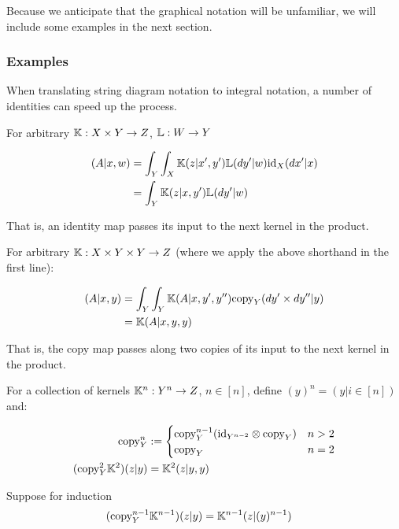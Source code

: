 Because we anticipate that the graphical notation will be unfamiliar, we will include some examples in the next section.

\subsubsection{Examples}

When translating string diagram notation to integral notation, a number of identities can speed up the process.

For arbitrary $\mathbb{K}:X\times Y\to Z$, $\mathbb{L}:W\to Y$

\begin{align}
 [(\text{id}_X\otimes \kernel{L})\kernel{K}](A|x,w) &= \int_{Y}\int_X   \kernel{K}(z|x',y')\kernel{L}(dy'|w)\text{id}_X(dx'|x)\\
										   &= \int_Y  \kernel{K}(z|x,y') \kernel{L}(dy'|w)
\end{align}

That is, an identity map passes its input to the next kernel in the product. 

For arbitrary $\mathbb{K}: X\times Y\times Y\to Z$ (where we apply the above shorthand in the first line):

\begin{align}
 [(\text{id}_X\otimes \text{copy}_Y)\kernel{K}](A|x,y) &= \int_Y\int_Y \kernel{K}(A|x,y',y'') \text{copy}_Y(dy'\times dy''|y)\\
										   &= \kernel{K}(A|x,y,y)
\end{align}

That is, the copy map passes along two copies of its input to the next kernel in the product. 

For a collection of kernels $\mathbb{K}^n:Y^n\to Z$, $n\in[n]$, define $(y)^{n}=(y|i\in[n])$ and:

\begin{align}
	\text{copy}^n_Y &:= \begin{cases}
	\text{copy}^{n-1}_Y(\text{id}_{Y^{n-2}}\otimes \text{copy}_Y) & n>2\\
	\text{copy}_Y & n=2
	\end{cases}\\
	(\text{copy}^2_Y\mathbb{K}^2)(z|y) &= \mathbb{K}^2(z|y,y)\\
\end{align}

Suppose for induction
\begin{align}
(\text{copy}^{n-1}_Y\mathbb{K}^{n-1})(z|y) &= \mathbb{K}^{n-1}(z|(y)^{n-1})
\end{align}


